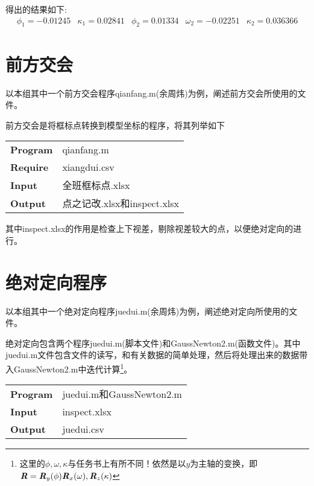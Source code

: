得出的结果如下:
\begin{equation}
\begin{array}{lllll}
\phi_1=-0.01245 & \kappa_1=0.02841 & \phi_2=0.01334 & \omega_2=-0.02251 & \kappa_2=0.036366
\end{array}
\end{equation}

\section{前方交会}

以本组其中一个前方交会程序qianfang.m(余周炜)为例，阐述前方交会所使用的文件。

前方交会是将框标点转换到模型坐标的程序，将其列举如下

\begin{table}[htbp]
\begin{tabular}{p{10em}p{8cm}}
\toprule
\textbf{Program} & qianfang.m \\
\textbf{Require} & xiangdui.csv \\
\textbf{Input} & 全班框标点.xlsx \\
\textbf{Output} & 点之记改.xlsx和inspect.xlsx \\
\bottomrule
\end{tabular}
\end{table}

其中inspect.xlsx的作用是检查上下视差，剔除视差较大的点，以便绝对定向的进行。

\section{绝对定向程序}

以本组其中一个绝对定向程序juedui.m(余周炜)为例，阐述绝对定向所使用的文件。

绝对定向包含两个程序juedui.m(脚本文件)和GaussNewton2.m(函数文件)。其中juedui.m文件包含文件的读写，和有关数据的简单处理，然后将处理出来的数据带入GaussNewton2.m中迭代计算\footnote{这里的$\phi,\omega,\kappa$与任务书上有所不同！依然是以$y$为主轴的变换，即$\boldsymbol{\mathit{R}}=\boldsymbol{\mathit{R}}_y(\phi)\boldsymbol{\mathit{R}}_x(\omega),\boldsymbol{\mathit{R}}_z(\kappa)$}。

\begin{table}[htbp]
\begin{tabular}{p{10em}p{8cm}}
\toprule
\textbf{Program} & juedui.m和GaussNewton2.m \\
\textbf{Input} & inspect.xlsx \\
\textbf{Output} & juedui.csv \\
\bottomrule
\end{tabular}
\end{table}

